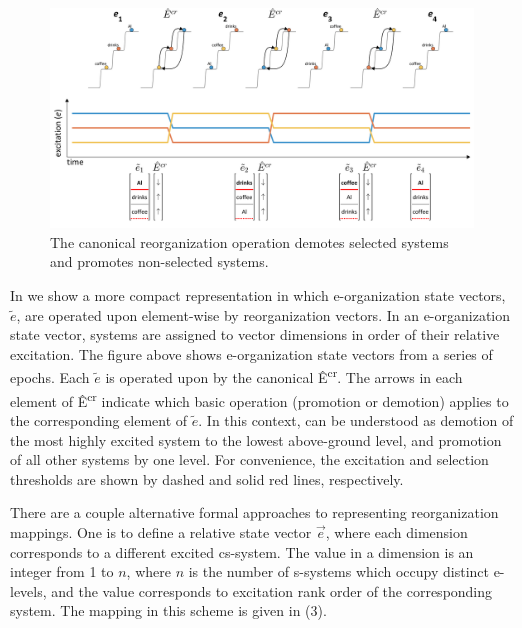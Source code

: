   
\begin{figure}
\includegraphics[width=\textwidth]{figures/Tilsen-img25.png}
\caption{The canonical reorganization operation demotes selected systems and promotes non-selected systems.}
\label{fig:2:18}
\end{figure}
 

  In {} we show a more compact representation in which e-organization state vectors,  $\widetilde{{e}}$, are operated upon element-wise by reorganization vectors. In an e-organization state vector, systems are assigned to vector dimensions in order of their relative excitation. The figure above shows e-organization state vectors from a series of epochs. Each  $\widetilde{{e}}$ is operated upon by the canonical  Ê\textsuperscript{cr}. The arrows in each element of Ê\textsuperscript{cr} indicate which basic operation (promotion or demotion) applies to the corresponding element of  $\widetilde{{e}}$. In this context,  can be understood as demotion of the most highly excited system to the lowest above-ground level, and promotion of all other systems by one level. For convenience, the excitation and selection thresholds are shown by dashed and solid red lines, respectively.

  There are a couple alternative formal approaches to representing reorganization mappings. One is to define a relative  state vector  $\overrightarrow{{e}}$, where each dimension corresponds to a different excited cs-system. The value in a dimension is an integer from 1 to $n$, where $n$ is the number of s-systems which occupy distinct e-levels, and the value corresponds to excitation rank order of the corresponding system. The  mapping in this scheme is given in (3).


